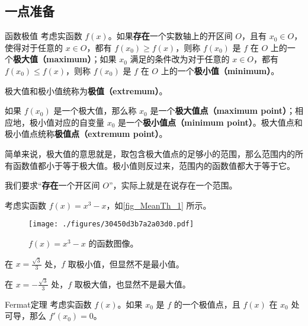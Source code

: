 

\subsection{一点准备}

\begin{definition}{函数极值}
考虑实函数 $f(x)$。如果\textbf{存在}一个实数轴上的开区间 $O$，且有 $x_0\in O$，使得对于任意的 $x\in O$，都有 $f(x_0)\geq f(x)$，则称 $f(x_0)$ 是 $f$ 在 $O$ 上的一个\textbf{极大值（maximum）}；如果 $x_0$ 满足的条件改为对于任意的 $x\in O$，都有 $f(x_0)\leq f(x)$，则称 $f(x_0)$ 是 $f$ 在 $O$ 上的一个\textbf{极小值（minimum）}。

极大值和极小值统称为\textbf{极值（extremum）}。

如果 $f(x_0)$ 是一个极大值，那么称 $x_0$ 是一个\textbf{极大值点（maximum point）}；相应地，极小值对应的自变量 $x_0$ 是一个\textbf{极小值点（minimum point）}。极大值点和极小值点统称\textbf{极值点（extremum point）}。
\end{definition}


简单来说，极大值的意思就是，取包含极大值点的足够小的范围，那么范围内的所有函数值都小于等于极大值。极小值则反过来，范围内的函数值都大于等于它。

我们要求“\textbf{存在}一个开区间 $O$”，实际上就是在说存在一个范围。

\begin{example}{}\label{ex_MeanTh_1}
考虑实函数 $f(x)=x^3-x$，如\autoref{fig_MeanTh_1} 所示。

\begin{figure}[ht]
\centering
\texttt{[image: ./figures/30450d3b7a2a03d0.pdf]}
\caption{$f(x)=x^3-x$ 的函数图像。} \label{fig_MeanTh_1}
\end{figure}

在 $x=\frac{\sqrt{3}}{3}$ 处，$f$ 取极小值，但显然不是最小值。

在 $x=-\frac{\sqrt{3}}{3}$ 处，$f$ 取极大值，也显然不是最大值。


\end{example}


\begin{theorem}{Fermat定理}\label{the_MeanTh_1}
考虑实函数 $f(x)$。如果 $x_0$ 是 $f$ 的一个极值点，且 $f(x)$ 在 $x_0$ 处可导，那么 $f'(x_0)=0$。
\end{theorem}

